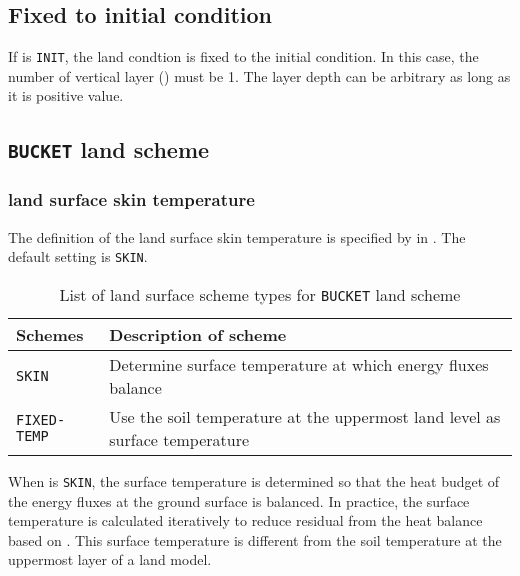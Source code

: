 \subsection{Fixed to initial condition}

If  is \verb|INIT|, the land condtion is fixed to the initial condition.
In this case, the number of vertical layer () must be 1.
The layer depth can be arbitrary as long as it is positive value.



\subsection{\texttt{BUCKET} land scheme}

\subsubsection{land surface skin temperature}

The definition of the land surface skin temperature is specified by  in .
The default setting is \verb|SKIN|.
%
\begin{table}[hbt]
\begin{center}
  \caption{List of land surface scheme types for \texttt{BUCKET} land scheme}
  \label{tab:nml_land_sfc}
  \begin{tabularx}{150mm}{lX} \hline
    \rowcolor[gray]{0.9}  Schemes & Description of scheme \\ \hline
      \verb|SKIN|       & Determine surface temperature at which energy fluxes balance \\
      \verb|FIXED-TEMP| & Use the soil temperature at the uppermost land level as surface temperature \\
    \hline
  \end{tabularx}
\end{center}
\end{table}

When  is \verb|SKIN|,
the surface temperature is determined so that the heat budget of the energy fluxes at the ground surface is balanced.
In practice, the surface temperature is calculated iteratively to reduce residual from the heat balance based on \citet{tomita_2009}.
This surface temperature is different from the soil temperature at the uppermost layer of a land model.

